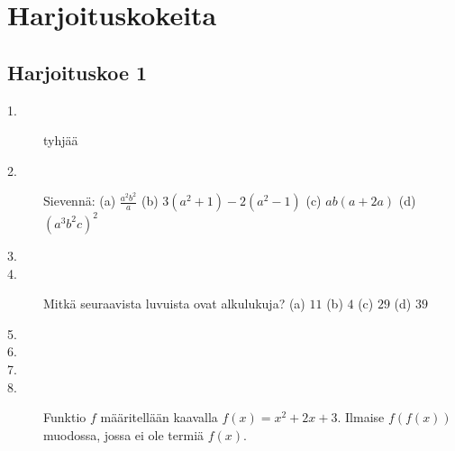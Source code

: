 \chapter{Harjoituskokeita}

\section*{Harjoituskoe 1}

\begin{description}
	\item[1.] tyhjää
	\item[2.] Sievennä: (a) $\frac{a^2 b^2}{a}$ (b) $3(a^2+1)-2(a^2-1)$ (c) $ab(a+2a)$ (d) $(a^3 b^2 c)^2$
	\item[3.]
	\item[4.] Mitkä seuraavista luvuista ovat alkulukuja? (a) $11$ (b) $4$ (c) $29$ (d) $39$
	\item[5.]
	\item[6.] 
	\item[7.] 
	\item[8.] Funktio $f$ määritellään kaavalla $f(x) = x^2 + 2x + 3$. Ilmaise $f(f(x))$ muodossa, jossa ei ole termiä $f(x)$.
\end{description}